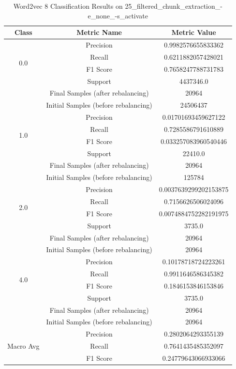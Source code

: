 \begin{longtable}{|c|c|c|}
\caption{Word2vec 8 Classification Results on 25\_filtered\_chunk\_extraction\_-e\_none\_-s\_activate} \label{tab:25_filtered_chunk_extraction_-e_none_-s_activate_word2vec_8_classifiers_results} \\
\hline
Class & Metric Name & Metric Value \\
\hline
\multirow{4}{*}{0.0} & Precision & 0.9982576655833362 \\
 & Recall & 0.6211882057428021 \\
 & F1 Score & 0.7658247788731783 \\
 & Support & 4437346.0 \\
 & Final Samples (after rebalancing) & 20964 \\
 & Initial Samples (before rebalancing) & 24506437 \\
\hline
\multirow{4}{*}{1.0} & Precision & 0.01701693459627122 \\
 & Recall & 0.7285586791610889 \\
 & F1 Score & 0.033257083960540446 \\
 & Support & 22410.0 \\
 & Final Samples (after rebalancing) & 20964 \\
 & Initial Samples (before rebalancing) & 125784 \\
\hline
\multirow{4}{*}{2.0} & Precision & 0.0037639299202153875 \\
 & Recall & 0.7156626506024096 \\
 & F1 Score & 0.0074884752282191975 \\
 & Support & 3735.0 \\
 & Final Samples (after rebalancing) & 20964 \\
 & Initial Samples (before rebalancing) & 20964 \\
\hline
\multirow{4}{*}{4.0} & Precision & 0.10178718724223261 \\
 & Recall & 0.9911646586345382 \\
 & F1 Score & 0.1846153846153846 \\
 & Support & 3735.0 \\
 & Final Samples (after rebalancing) & 20964 \\
 & Initial Samples (before rebalancing) & 20964 \\
\hline
\multirow{4}{*}{Macro Avg} & Precision & 0.2802064293355139 \\
 & Recall & 0.7641435485352097 \\
 & F1 Score & 0.24779643066933066 \\

\end{longtable}

